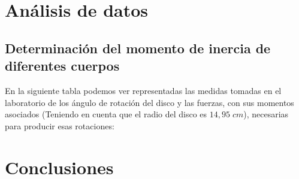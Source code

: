 \documentclass[a4paper,12pt,titlepage]{article}
\begin{document}
\section{Análisis de datos}

\subsection{Determinación del momento de inercia de diferentes cuerpos}

En la siguiente tabla podemos ver representadas las medidas tomadas en el laboratorio de los ángulo de rotación del disco y las fuerzas, con sus momentos asociados (Teniendo en cuenta que el radio del disco es $14,95 \; cm$), necesarias para producir esas rotaciones:


\section{Conclusiones}
\end{document}
